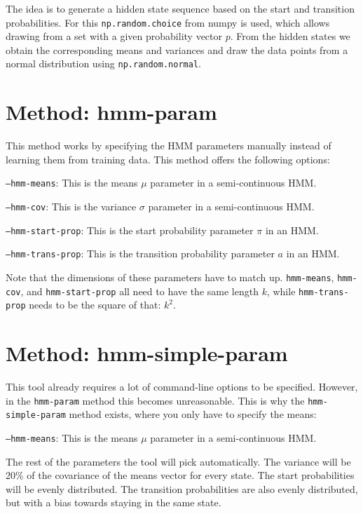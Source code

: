 The idea is to generate a hidden state sequence based on the start and transition probabilities. For this \texttt{np.random.choice} from numpy is used, which allows drawing from a set with a given probability vector $p$. From the hidden states we obtain the corresponding means and variances and draw the data points from a normal distribution using \texttt{np.random.normal}.

\section{Method: hmm-param}

This method works by specifying the HMM parameters manually instead of learning them from training data. This method offers the following options: 

\texttt{---hmm-means}: This is the means $\mu$ parameter in a semi-continuous HMM. 

\texttt{---hmm-cov}: This is the variance $\sigma$ parameter in a semi-continuous HMM. 

\texttt{---hmm-start-prop}: This is the start probability parameter $\pi$ in an HMM. 

\texttt{---hmm-trans-prop}: This is the transition probability parameter $a$ in an HMM. 

Note that the dimensions of these parameters have to match up. \texttt{hmm-means}, \texttt{hmm-cov}, and \texttt{hmm-start-prop} all need to have the same length $k$, while \texttt{hmm-trans-prop} needs to be the square of that: $k^2$. 

\section{Method: hmm-simple-param}

This tool already requires a lot of command-line options to be specified. However, in the \texttt{hmm-param} method this becomes unreasonable. This is why the \texttt{hmm-simple-param} method exists, where you only have to specify the means: 

\texttt{---hmm-means}: This is the means $\mu$ parameter in a semi-continuous HMM. 

The rest of the parameters the tool will pick automatically. The variance will be 20\% of the covariance of the means vector for every state. The start probabilities will be evenly distributed. The transition probabilities are also evenly distributed, but with a bias towards staying in the same state. 

